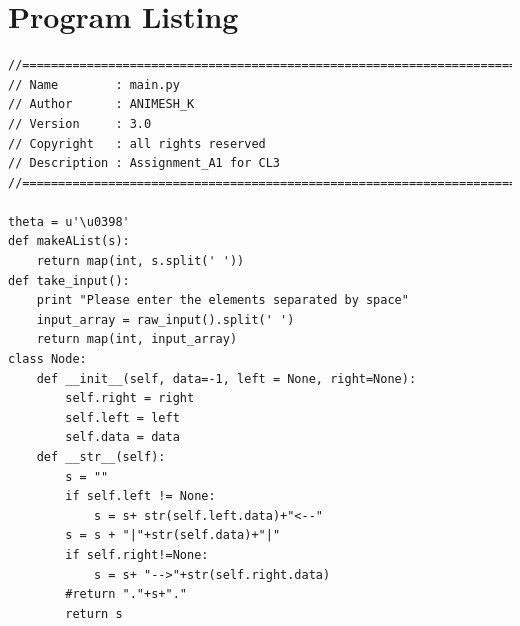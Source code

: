 \documentclass[10pt,a4paper]{article}
\begin{document}
\section{Program Listing}
\begin{lstlisting}
//============================================================================
// Name        : main.py
// Author      : ANIMESH_K
// Version     : 3.0
// Copyright   : all rights reserved
// Description : Assignment_A1 for CL3
//============================================================================

theta = u'\u0398'
def makeAList(s):
    return map(int, s.split(' '))
def take_input():
    print "Please enter the elements separated by space"
    input_array = raw_input().split(' ')
    return map(int, input_array)
class Node:
    def __init__(self, data=-1, left = None, right=None):
        self.right = right
        self.left = left
        self.data = data
    def __str__(self):
        s = ""
        if self.left != None:
            s = s+ str(self.left.data)+"<--"
        s = s + "|"+str(self.data)+"|"
        if self.right!=None:
            s = s+ "-->"+str(self.right.data)
        #return "."+s+"."
        return s


\end{lstlisting}
\end{document}
